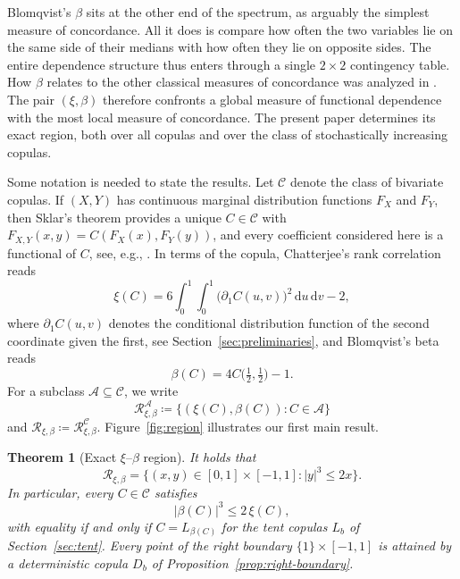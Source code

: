 \documentclass[twocolumn,a4paper]{article}
\numberwithin{equation}{section}
\newtheorem{theorem}{Theorem}[section]
\theoremstyle{remark}
\newcommand{\CC}{\mathcal{C}}
\newcommand{\RR}{\mathcal{R}}
\newcommand{\AAA}{\mathcal{A}}
\newcommand{\1}{\mathbf{1}}
\newcommand{\de}{\,\mathrm{d}}
\begin{document}
Blomqvist's \(\beta\) \cite{blomqvist1950measure} sits at the other end of the spectrum, as arguably the simplest measure of concordance.
All it does is compare how often the two variables lie on the same side of their medians with how often they lie on opposite sides.
The entire dependence structure thus enters through a single \(2\times2\) contingency table.
How \(\beta\) relates to the other classical measures of concordance was analyzed in \cite{kokolbukovsek2019relation,bukovvsek2021exact}.
The pair \((\xi,\beta)\) therefore confronts a global measure of functional dependence with the most local measure of concordance.
The present paper determines its exact region, both over all copulas and over the class of stochastically increasing copulas.

Some notation is needed to state the results.
Let \(\CC\) denote the class of bivariate copulas.
If \((X,Y)\) has continuous marginal distribution functions \(F_X\) and \(F_Y\), then Sklar's theorem \cite{sklar1959fonctions} provides a unique \(C\in\CC\) with \(F_{X,Y}(x,y)=C(F_X(x),F_Y(y))\), and every coefficient considered here is a functional of \(C\), see, e.g., \cite{nelsen2006introduction,durante2016principles}.
In terms of the copula, Chatterjee's rank correlation reads
\begin{equation}\label{eq:xi-def}
\xi(C)=6\int_0^1\!\!\int_0^1\bigl(\partial_1C(u,v)\bigr)^2\de u\de v-2,
\end{equation}
where \(\partial_1C(u,v)\) denotes the conditional distribution function of the second coordinate given the first, see Section~\ref{sec:preliminaries}, and Blomqvist's beta reads
\begin{equation}\label{eq:beta-def}
\beta(C)=4C\bigl(\tfrac12,\tfrac12\bigr)-1.
\end{equation}
For a subclass \(\AAA\subseteq\CC\), we write
\[
\RR^{\AAA}_{\xi,\beta}\coloneqq\{(\xi(C),\beta(C)):C\in\AAA\}
\]
and \(\RR_{\xi,\beta}\coloneqq\RR^{\CC}_{\xi,\beta}\).
Figure~\ref{fig:region} illustrates our first main result.

\begin{theorem}[Exact \(\xi\)--\(\beta\) region]\label{thm:main}
It holds that
\[
\RR_{\xi,\beta}=\bigl\{(x,y)\in[0,1]\times[-1,1]:|y|^3\le2x\bigr\}.
\]
In particular, every \(C\in\CC\) satisfies
\begin{equation}\label{eq:main-ineq}
|\beta(C)|^3\le2\,\xi(C),
\end{equation}
with equality if and only if \(C=L_{\beta(C)}\) for the tent copulas \(L_b\) of Section~\ref{sec:tent}.
Every point of the right boundary \(\{1\}\times[-1,1]\) is attained by a deterministic copula \(D_b\) of Proposition~\ref{prop:right-boundary}.
\end{theorem}
\end{document}
